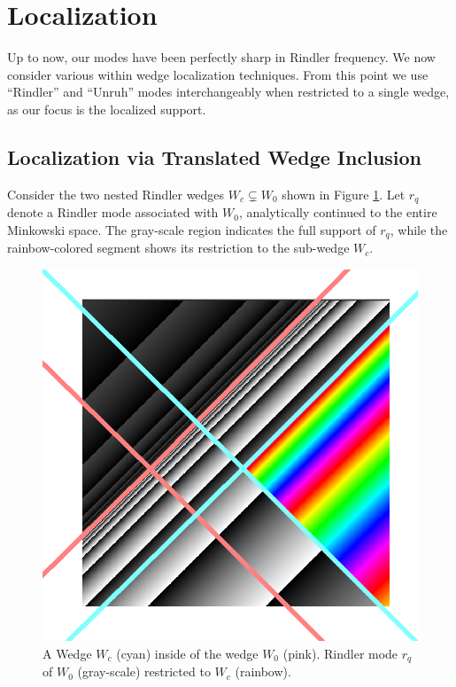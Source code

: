 \documentclass[12pt,a4paper]{article}
\begin{document}
{\section{Localization} \label{sec:loc}

Up to now, our modes have been perfectly sharp in Rindler frequency. We now consider various within wedge localization techniques. From this point we use ``Rindler'' and ``Unruh'' modes interchangeably when restricted to a single wedge, as our focus is the localized support.

\subsection{Localization via Translated Wedge Inclusion}

Consider the two nested Rindler wedges $W_c \subsetneq W_0$ shown in Figure \ref{restrict}. Let $r_q$ denote a Rindler mode associated with $W_0$, analytically continued to the entire Minkowski space. The gray-scale region indicates the full support of $r_q$, while the rainbow-colored segment shows its restriction to the sub-wedge $W_c$.

\begin{figure}[h]
  \centering
\includegraphics[scale=0.4]{wedge_in_wedge.png}
\caption{A Wedge $W_c$ (cyan) inside of the wedge $W_0$ (pink). Rindler mode $r_q$ of $W_0$ (gray-scale) restricted to $W_c$ (rainbow).}
\label{restrict}
\end{figure}

}
\end{document}
